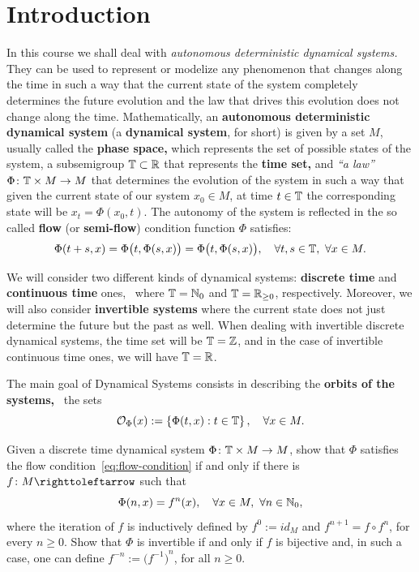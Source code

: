 \section{Introduction}\label{sec:introduction}

In this course we shall deal with \emph{autonomous deterministic dynamical systems.} They can be used to represent or modelize any phenomenon that changes along the time in such a way that the current state of the system completely determines the future evolution and the law that drives this evolution does not change along the time. Mathematically, an \textbf{autonomous deterministic dynamical system} (a \textbf{dynamical system}, for short) is given by a set $M$, usually called the \textbf{phase space,} which represents the set of possible states of the system, a subsemigroup $\mathbb{T}\subset\mathbb{R}$ that represents the \textbf{time set,} and \emph{``a law''} $\Phi\colon\mathbb{T}\times M\to M$ that determines the evolution of the system in such a way that given the current state of our system $x_{0}\in M$, at time $t\in\mathbb{T}$ the corresponding state will be $x_{t}=\Phi(x_{0},t)$. The autonomy of the system is reflected in the so called \textbf{flow} (or \textbf{semi-flow}) condition function $\Phi$ satisfies:
\begin{equation}\label{eq:flow-condition}
  \Phi(t+s,x)=\Phi\big(t,\Phi(s,x)\big) = \Phi\big(t,\Phi(s,x)\big), \quad\forall t,s\in\mathbb{T},\ \forall x\in M.
\end{equation}

We will consider two different kinds of dynamical systems: \textbf{discrete time} and \textbf{continuous time} ones, \ie~where $\mathbb{T}=\mathbb{N}_{0}$ and $\mathbb{T}=\mathbb{R}_{\geq 0}$, respectively. Moreover, we will also consider \textbf{invertible systems} where the current state does not just determine the future but the past as well. When dealing with invertible discrete dynamical systems, the time set will be $\mathbb{T}=\mathbb{Z}$, and in the case of invertible continuous time ones, we will have $\mathbb{T}=\mathbb{R}$.

The main goal of Dynamical Systems consists in describing the \textbf{orbits of the systems,} \ie~the sets
\begin{displaymath}
  \mathcal{O}_{\Phi}(x):=\left\{\Phi(t,x) : t\in\mathbb{T}\right\}, \quad\forall x\in M.
\end{displaymath}


\begin{exercise}
  Given a discrete time dynamical system $\Phi\colon\mathbb{T}\times M\to M$, show that $\Phi$ satisfies the flow condition~\eqref{eq:flow-condition} if and only if there is $f\colon M\carr$ such that
  \begin{displaymath}
    \Phi(n,x)=f^{n}(x), \quad\forall x\in M,\ \forall n\in\N_{0},
  \end{displaymath}
  where the iteration of $f$ is inductively defined by $f^{0}:=id_{M}$ and $f^{n+1}=f\circ f^{n}$, for every $n\geq 0$. Show that $\Phi$ is invertible if and only if $f$ is bijective and, in such a case, one can define $f^{-n}:={\big(f^{-1}\big)}^{n}$, for all $n\geq 0$.
\end{exercise}

